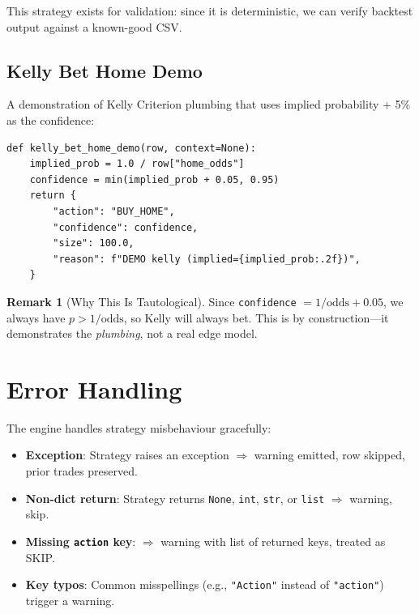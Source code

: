 \documentclass[12pt,a4paper]{report}
\theoremstyle{definition}
\newtheorem{remark}{Remark}[chapter]
\newcommand{\code}[1]{\texttt{#1}}
\begin{document}
This strategy exists for validation: since it is deterministic, we can verify backtest output against a known-good CSV.

\subsection{Kelly Bet Home Demo}

A demonstration of Kelly Criterion plumbing that uses implied probability + 5\% as the confidence:

\begin{lstlisting}[caption={Kelly demo strategy (DO NOT use in production).}]
def kelly_bet_home_demo(row, context=None):
    implied_prob = 1.0 / row["home_odds"]
    confidence = min(implied_prob + 0.05, 0.95)
    return {
        "action": "BUY_HOME",
        "confidence": confidence,
        "size": 100.0,
        "reason": f"DEMO kelly (implied={implied_prob:.2f})",
    }
\end{lstlisting}

\begin{remark}[Why This Is Tautological]
Since \code{confidence} $= 1/\text{odds} + 0.05$, we always have $p > 1/\text{odds}$, so Kelly will always bet. This is by construction—it demonstrates the \emph{plumbing}, not a real edge model.
\end{remark}

\section{Error Handling}

The engine handles strategy misbehaviour gracefully:

\begin{itemize}
    \item \textbf{Exception}: Strategy raises an exception $\Rightarrow$ warning emitted, row skipped, prior trades preserved.
    \item \textbf{Non-dict return}: Strategy returns \code{None}, \code{int}, \code{str}, or \code{list} $\Rightarrow$ warning, skip.
    \item \textbf{Missing \code{action} key}: $\Rightarrow$ warning with list of returned keys, treated as SKIP.
    \item \textbf{Key typos}: Common misspellings (e.g., \code{"Action"} instead of \code{"action"}) trigger a warning.
\end{itemize}


\end{document}
